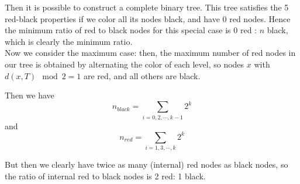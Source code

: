 \documentclass[paper=a4, fontsize=11pt]{scrartcl} %
\numberwithin{equation}{section} %
\numberwithin{figure}{section} %
\numberwithin{table}{section} %
\begin{document}
Then it is possible to construct a complete binary tree. This tree satisfies the 5 red-black properties if we color all its nodes black, and have 0 red nodes. Hence the minimum ratio of red to black nodes for this special case is 0 red : $n$ black, which is clearly the minimum ratio.\\

Now we consider the maximum case: then, the maximum number of red nodes in our tree is obtained by alternating the color of each level, so nodes $x$ with $d(x, T) \mod 2 = 1$ are red, and all others are black.

Then we have
\[n_{black} = \sum_{i = 0, 2, \cdots, k-1}  2^k\]
and 
\[n_{red} = \sum_{i = 1, 3, \cdots, k}  2^k\]

But then we clearly have twice as many (internal) red nodes as black nodes, so the ratio of internal red to black nodes is 2 red: 1 black.
\end{document}
